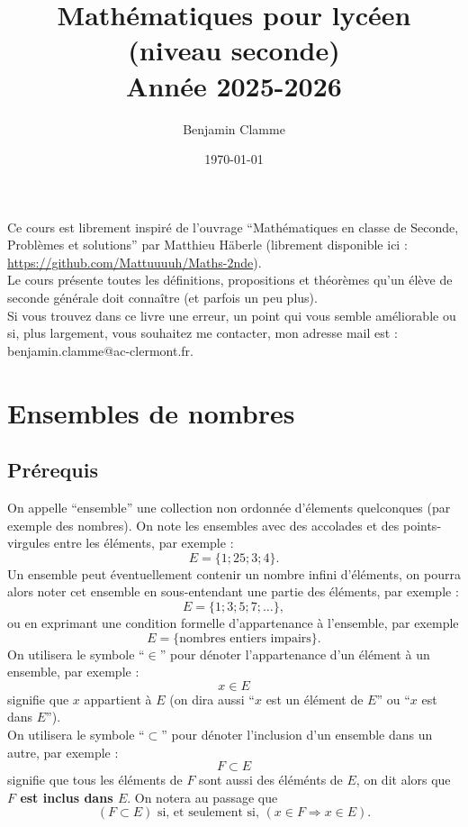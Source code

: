 \documentclass[a4paper, 12pt]{report}
\title{
	{\Huge Mathématiques pour lycéen (niveau seconde)} \\ 
	{\Large Année 2025-2026}
}
\author{\huge{Benjamin Clamme}}
\date{\today}
\begin{document}
\maketitle

Ce cours est librement inspiré de l'ouvrage ``Mathématiques en classe de Seconde, Problèmes et solutions'' par Matthieu Häberle (librement disponible ici : \url{https://github.com/Mattuuuuh/Maths-2nde}). \\

Le cours présente toutes les définitions, propositions et théorèmes qu'un élève de seconde générale doit connaître (et parfois un peu plus).  \\

Si vous trouvez dans ce livre une erreur, un point qui vous semble améliorable ou si, plus largement, vous souhaitez me contacter, mon adresse mail est : benjamin.clamme@ac-clermont.fr.
\newpage

\chapter{Ensembles de nombres}

\section{Prérequis}

\begin{nota}
On appelle ``ensemble'' une collection non ordonnée d'élements quelconques (par exemple des nombres). On note les ensembles avec des accolades et des points-virgules entre les éléments, par exemple :
\[ E = \{ 1 ; 25 ; 3 ; 4 \}. \]
Un ensemble peut éventuellement contenir un nombre infini d'éléments, on pourra alors noter cet ensemble en sous-entendant une partie des éléments, par exemple :
\[ E = \{1 ; 3 ; 5 ; 7 ; \dots \}, \]
ou en exprimant une condition formelle d'appartenance à l'ensemble, par exemple 
\[ E = \{ \text{nombres entiers impairs} \}. \]
On utilisera le symbole ``$\in$'' pour dénoter l'appartenance d'un élément à un ensemble, par exemple :
\[ x \in E \]
signifie que $x$ appartient à $E$ (on dira aussi ``$x$ est un élément de $E$'' ou ``$x$ est dans $E$''). \\
On utilisera le symbole ``$\subset$'' pour dénoter l'inclusion d'un ensemble dans un autre, par exemple :
\[ F \subset E \]
signifie que tous les éléments de $F$ sont aussi des éléménts de $E$, on dit alors que \textbf{$F$ est inclus dans $E$}. On notera au passage que 
\[ (F \subset E) \text{ si, et seulement si, } (x \in F \Rightarrow x \in E). \] 
\end{nota}
\end{document}
